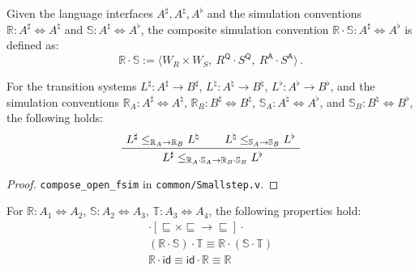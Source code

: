 \documentclass[sigplan,10pt,review,anonymous]{acmart}
\newcommand{\kw}[1]{\ensuremath{ \mathsf{#1} }}
\newcommand{\ifr}[1]{\mathrel{[{#1}]}}
\begin{document}
\begin{definition} %
Given the language interfaces $A^\sharp, A^\natural, A^\flat$
and the simulation conventions
$\mathbb{R} : A^\sharp \Leftrightarrow A^\natural$ and
$\mathbb{S} : A^\natural \Leftrightarrow A^\flat$,
the composite simulation convention
$\mathbb{R} \cdot \mathbb{S} : A^\sharp \Leftrightarrow A^\flat$ is defined as:
\[
    \mathbb{R} \cdot \mathbb{S} :=
      \langle
        W_R \times W_S, \:
        R^\kw{Q} \cdot S^\kw{Q}, \:
        R^\kw{A} \cdot S^\kw{A}
      \rangle \,.
\]
\end{definition}

\begin{theorem} \label{thm:simcomp} %
For the transition systems
$L^\sharp : A^\sharp \rightarrow B^\sharp$,
$L^\natural : A^\natural \rightarrow B^\natural$,
$L^\flat : A^\flat \rightarrow B^\flat$,
and the simulation conventions
$\mathbb{R}_A : A^\sharp \Leftrightarrow A^\natural$,
$\mathbb{R}_B : B^\sharp \Leftrightarrow B^\natural$,
$\mathbb{S}_A : A^\natural \Leftrightarrow A^\flat$, and
$\mathbb{S}_B : B^\natural \Leftrightarrow B^\flat$,
the following holds:
\[
  \AxiomC{$L^\sharp \le_{\mathbb{R}_A \rightarrow \mathbb{R}_B} L^\natural$}
  \AxiomC{$L^\natural \le_{\mathbb{S}_A \rightarrow \mathbb{S}_B} L^\flat$}
  \BinaryInfC{
    $L^\sharp \le_{\mathbb{R}_A \cdot \mathbb{S}_A \rightarrow
                   \mathbb{R}_B \cdot \mathbb{S}_B} L^\flat$}
  \DisplayProof
\]
\begin{proof}
\texttt{compose\_open\_fsim} in \texttt{common/Smallstep.v}.
\end{proof}
\end{theorem}

\begin{theorem} %
For
$\mathbb{R} : A_1 \Leftrightarrow A_2$,
$\mathbb{S} : A_2 \Leftrightarrow A_3$,
$\mathbb{T} : A_3 \Leftrightarrow A_4$,
the following properties hold:
\begin{gather*}
  {\cdot} \ifr{{\sqsubseteq} \times {\sqsubseteq} \rightarrow
               {\sqsubseteq}} {\cdot}
  \\
  (\mathbb{R} \cdot \mathbb{S}) \cdot \mathbb{T} \equiv
    \mathbb{R} \cdot (\mathbb{S} \cdot \mathbb{T})
  \\
  \mathbb{R} \cdot \kw{id} \equiv
  \kw{id} \cdot \mathbb{R} \equiv
  \mathbb{R}
\end{gather*}
\end{theorem}
\end{document}
